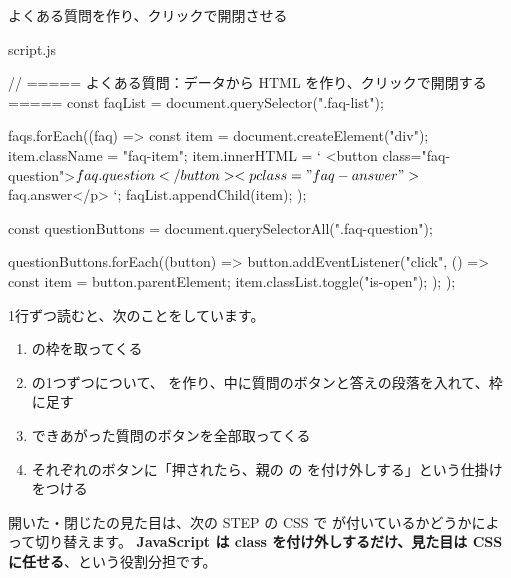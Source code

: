 \begin{step}{よくある質問を作り、クリックで開閉させる}
\begin{filebox}{script.js}
\begin{Piton}[language=code]
// ===== よくある質問：データから HTML を作り、クリックで開閉する =====
const faqList = document.querySelector(".faq-list");

faqs.forEach((faq) => {
  const item = document.createElement("div");
  item.className = "faq-item";
  item.innerHTML = `
    <button class="faq-question">${faq.question}</button>
    <p class="faq-answer">${faq.answer}</p>
  `;
  faqList.appendChild(item);
});

const questionButtons = document.querySelectorAll(".faq-question");

questionButtons.forEach((button) => {
  button.addEventListener("click", () => {
    const item = button.parentElement;
    item.classList.toggle("is-open");
  });
});

\end{Piton}
\end{filebox}
1行ずつ読むと、次のことをしています。
\begin{enumerate}
  \item {} の枠を取ってくる
  \item {} の1つずつについて、 を作り、中に質問のボタンと答えの段落を入れて、枠に足す
  \item できあがった質問のボタンを全部取ってくる
  \item それぞれのボタンに「押されたら、親の  の  を付け外しする」という仕掛けをつける
\end{enumerate}
開いた・閉じたの見た目は、次の STEP の CSS で  が付いているかどうかによって切り替えます。
\textbf{JavaScript は class を付け外しするだけ、見た目は CSS に任せる}、という役割分担です。
\end{step}

